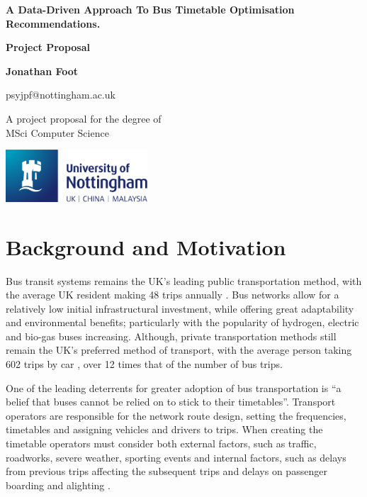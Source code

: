 \documentclass[]{report}
\begin{document}
\begin{titlepage}
	\begin{center}
		\vspace*{1cm}
		\Huge
		\textbf{A Data-Driven Approach To Bus Timetable Optimisation Recommendations.}
		
		\LARGE
		\vspace{0.5cm}
		\textbf{Project Proposal}
		
		\vspace{1.5cm}
		
		\textbf{Jonathan Foot}
		
		psyjpf@nottingham.ac.uk
		
		
		\vspace{2.5cm}
		
		A project proposal for the degree of\\
		MSci Computer Science
		
		
		\vfill
		
		\includegraphics[width=200px]{images/nottingham-logo.png}
	\end{center}
\end{titlepage}



\section*{Background and Motivation}
Bus transit systems remains the UK's leading public transportation method, with the average UK resident making 48 trips annually \cite{RN9}. Bus networks allow for a relatively low initial infrastructural investment, while offering great adaptability and environmental benefits; particularly with the popularity of hydrogen, electric and bio-gas buses increasing. Although, private transportation methods still remain the UK's preferred method of transport, with the average person taking 602 trips by car \cite{RN9}, over 12 times that of the number of bus trips. 

\vspace{0.5cm}
One of the leading deterrents for greater adoption of bus transportation is ``a belief that buses cannot be relied on to stick to their timetables''\cite{RN10}. Transport operators are responsible for the network route design, setting the frequencies, timetables and assigning vehicles and drivers to trips. When creating the timetable operators must consider both external factors, such as traffic, roadworks, severe weather, sporting events and internal factors, such as delays from previous trips affecting the subsequent trips and delays on passenger boarding and alighting \cite{RN11}.
\end{document}
